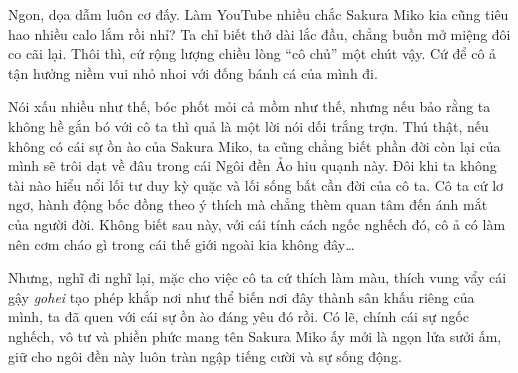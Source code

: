 \documentclass[../main.tex]{subfiles}
\begin{document}
Ngon, dọa dẫm luôn cơ đấy. Làm YouTube nhiều chắc Sakura Miko kia cũng tiêu hao nhiều calo lắm rồi nhỉ? Ta chỉ biết thở dài lắc đầu, chẳng buồn mở miệng đôi co cãi lại. Thôi thì, cứ rộng lượng chiều lòng ``cô chủ'' một chút vậy. Cứ để cô ả tận hưởng niềm vui nhỏ nhoi với đống bánh cá của mình đi.

Nói xấu nhiều như thế, bóc phốt mỏi cả mồm như thế, nhưng nếu bảo rằng ta không hề gắn bó với cô ta thì quả là một lời nói dối trắng trợn. Thú thật, nếu không có cái sự ồn ào của Sakura Miko, ta cũng chẳng biết phần đời còn lại của mình sẽ trôi dạt về đâu trong cái Ngôi đền Ảo hiu quạnh này. Đôi khi ta không tài nào hiểu nổi lối tư duy kỳ quặc và lối sống bất cần đời của cô ta. Cô ta cứ lơ ngơ, hành động bốc đồng theo ý thích mà chẳng thèm quan tâm đến ánh mắt của người đời. Không biết sau này, với cái tính cách ngốc nghếch đó, cô ả có làm nên cơm cháo gì trong cái thế giới ngoài kia không đây\dots

Nhưng, nghĩ đi nghĩ lại, mặc cho việc cô ta cứ thích làm màu, thích vung vẩy cái gậy \textit{gohei} tạo phép khắp nơi như thể biến nơi đây thành sân khấu riêng của mình, ta đã quen với cái sự ồn ào đáng yêu đó rồi. Có lẽ, chính cái sự ngốc nghếch, vô tư và phiền phức mang tên Sakura Miko ấy mới là ngọn lửa sưởi ấm, giữ cho ngôi đền này luôn tràn ngập tiếng cười và sự sống động.
\end{document}
